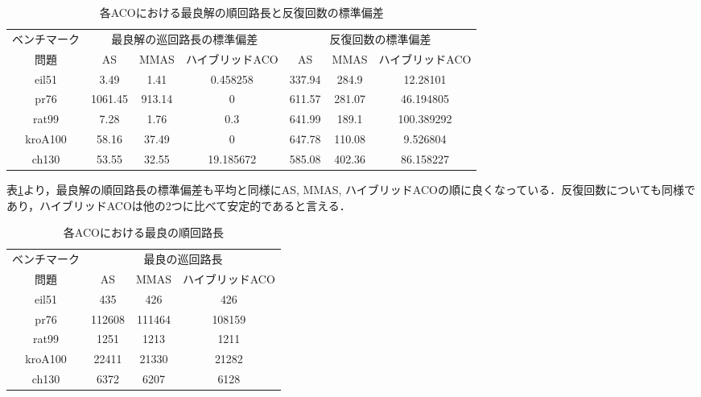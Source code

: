 \documentclass[a4j]{jsarticle}
\begin{document}
\begin{table}[htb]
 \begin{center}
  \caption{各ACOにおける最良解の順回路長と反復回数の標準偏差}
  \label{acosd}
  \begin{tabular}[tb]{|c||c|c|c||c|c|c|} \hline
 ベンチマーク& \multicolumn{3}{|c||}{最良解の巡回路長の標準偏差}& \multicolumn{3}{|c|}{反復回数の標準偏差} \\\cline{2-7}
問題 & AS & MMAS & ハイブリッドACO & AS & MMAS & ハイブリッドACO \\\hline
eil51 & 3.49 & 1.41 & 0.458258 & 337.94 & 284.9 & 12.28101 \\\hline
pr76 & 1061.45 & 913.14 & 0 & 611.57 & 281.07 & 46.194805 \\\hline
rat99 & 7.28 & 1.76 & 0.3 & 641.99 & 189.1 & 100.389292 \\\hline
kroA100 & 58.16 & 37.49 & 0 & 647.78 & 110.08 & 9.526804 \\\hline
ch130 & 53.55 & 32.55 & 19.185672 & 585.08 & 402.36 & 86.158227 \\\hline
  \end{tabular}
 \end{center}
\end{table}
\par
表\ref{acosd}より，最良解の順回路長の標準偏差も平均と同様にAS, MMAS, ハイブリッドACOの順に良くなっている．反復回数についても同様であり，ハイブリッドACOは他の2つに比べて安定的であると言える．

\begin{table}[htb]
 \begin{center}
  \caption{各ACOにおける最良の順回路長}
  \label{best}
  \begin{tabular}[tb]{|c||c|c|c|} \hline
 ベンチマーク& \multicolumn{3}{|c|}{最良の巡回路長} \\\cline{2-4}
問題 & AS & MMAS & ハイブリッドACO \\\hline
eil51 & 435 & 426 & 426 \\\hline
pr76 & 112608 & 111464 & 108159 \\\hline
rat99 & 1251 & 1213 & 1211 \\\hline
kroA100 & 22411 & 21330 & 21282 \\\hline
ch130 & 6372 & 6207 & 6128 \\\hline
  \end{tabular}
 \end{center}
\end{table}
\end{document}

